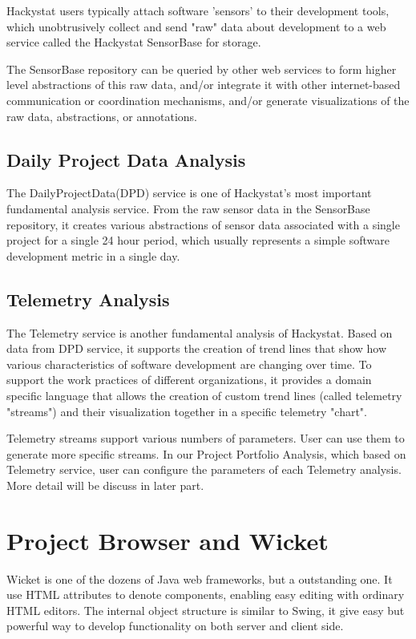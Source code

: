 Hackystat users typically attach software 'sensors' to their development tools, which unobtrusively collect and send "raw" data about development to a web service called the Hackystat SensorBase for storage.

The SensorBase repository can be queried by other web services to form higher level abstractions of this raw data, and/or integrate it with other internet-based communication or coordination mechanisms, and/or generate visualizations of the raw data, abstractions, or annotations.

\subsection{Daily Project Data Analysis}
The DailyProjectData(DPD) service is one of Hackystat's most important fundamental analysis service. From the raw sensor data in the SensorBase repository, it creates various abstractions of sensor data associated with a single project for a single 24 hour period, which usually represents a simple software development metric in a single day.

\subsection{Telemetry Analysis}
The Telemetry service is another fundamental analysis of Hackystat. Based on data from DPD service, it supports the creation of trend lines that show how various characteristics of software development are changing over time. To support the work practices of different organizations, it provides a domain specific language that allows the creation of custom trend lines (called telemetry "streams") and their visualization together in a specific telemetry "chart". 

Telemetry streams support various numbers of parameters. User can use them to generate more specific streams. In our Project Portfolio Analysis, which based on Telemetry service, user can configure the parameters of each Telemetry analysis. More detail will be discuss in later part.

\section {Project Browser and Wicket}
Wicket is one of the dozens of Java web frameworks, but a outstanding one. It use HTML attributes to denote components, enabling easy editing with ordinary HTML editors. The internal object structure is similar to Swing, it give easy but powerful way to develop functionality on both server and client side.

